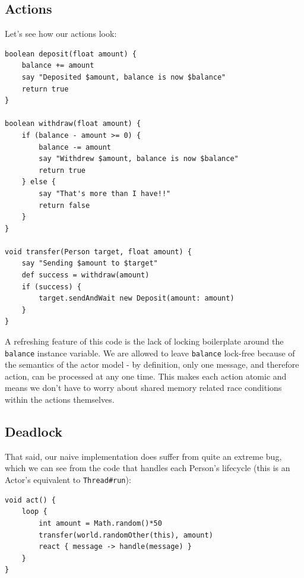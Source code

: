 \documentclass[a4paper,12pt]{kth-mag}
\begin{document}
\subsection{Actions}

Let's see how our actions look:

\begin{listing}[H]
	\begin{verbatim}
boolean deposit(float amount) {
    balance += amount
    say "Deposited $amount, balance is now $balance"
    return true
}

boolean withdraw(float amount) {
    if (balance - amount >= 0) {
        balance -= amount
        say "Withdrew $amount, balance is now $balance"
        return true
    } else {
        say "That's more than I have!!"
        return false
    }
}

void transfer(Person target, float amount) {
    say "Sending $amount to $target"
    def success = withdraw(amount)
    if (success) { 
        target.sendAndWait new Deposit(amount: amount)
    } 
}
	\end{verbatim}
\end{listing}

A refreshing feature of this code is the lack of locking boilerplate around the \texttt{balance} instance variable. We are allowed to leave \texttt{balance} lock-free because of the semantics of the actor model - by definition, only one message, and therefore action, can be processed at any one time. This makes each action atomic and means we don't have to worry about shared memory related race conditions within the actions themselves.

\subsection{Deadlock}

That said, our naive implementation does suffer from quite an extreme bug, which we can see from the code that handles each Person's lifecycle (this is an Actor's equivalent to \texttt{Thread\#run}):

\begin{listing}[H]
	\begin{verbatim}
void act() {
    loop {
        int amount = Math.random()*50
        transfer(world.randomOther(this), amount)
        react { message -> handle(message) }
    }
}
	\end{verbatim}
\end{listing}
\end{document}
